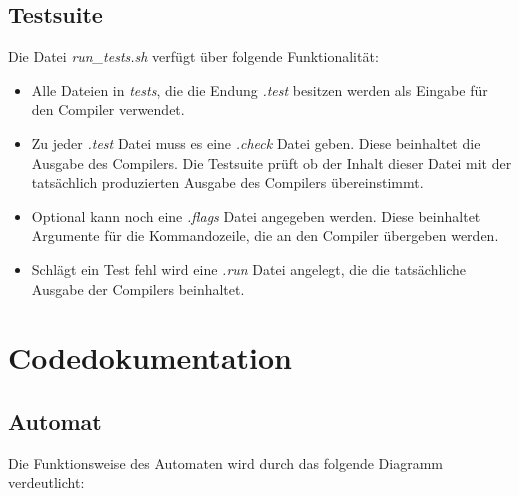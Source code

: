 \documentclass[a4paper,11pt,titlepage,openany,oneside]{scrbook}
\begin{document}
\section{Testsuite}

Die Datei \textit{run\_tests.sh} verfügt über folgende Funktionalität:

\begin{itemize}
  \item Alle Dateien in \textit{tests}, die die Endung \textit{.test} besitzen werden als Eingabe für den Compiler verwendet.
  \item Zu jeder \textit{.test} Datei muss es eine \textit{.check} Datei geben. Diese beinhaltet die Ausgabe des Compilers. Die Testsuite prüft ob der Inhalt dieser Datei mit der tatsächlich produzierten Ausgabe des Compilers übereinstimmt.
  \item Optional kann noch eine \textit{.flags} Datei angegeben werden. Diese beinhaltet Argumente für die Kommandozeile, die an den Compiler übergeben werden.
  \item Schlägt ein Test fehl wird eine \textit{.run} Datei angelegt, die die tatsächliche Ausgabe der Compilers beinhaltet.
\end{itemize}

\chapter{Codedokumentation}

\section{Automat}
Die Funktionsweise des Automaten wird durch das folgende Diagramm verdeutlicht:
\end{document}
